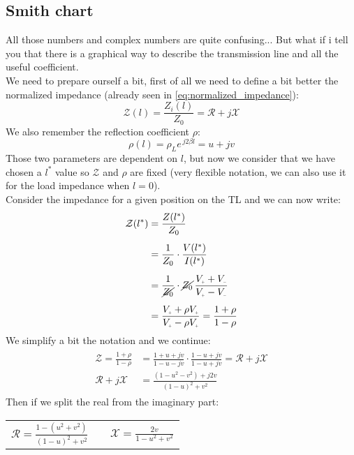 \subsection*{Smith chart}
All those numbers and complex numbers are quite confusing... But what if i tell you that there is a graphical way to describe the transmission line and all the useful coefficient.\\
We need to prepare ourself a bit, first of all we need to define a bit better the normalized impedance (already seen in \cref{eq:normalized_impedance}):
\begin{equation}
    \mathcal{Z}(l)=\frac{Z_i(l)}{Z_0}=\mathcal{R}+j\mathcal{X}
\end{equation}
We also remember the reflection coefficient $\rho$:
\begin{equation}
    \rho(l)=\rho_L e^{\,j2\beta l}=u+jv
\end{equation}
Those two parameters are dependent on $l$, but now we consider that we have chosen a $l^*$ value so $\mathcal{Z}$ and $\rho$ are fixed (very flexible notation, we can also use it for the load impedance when $l=0$).\\
Consider the impedance for a given position on the TL and we can now write:
\begin{align}
    \begin{split}
        \mathcal{Z}(l^*) &=\frac{Z(l^*)}{Z_0}\\[5pt]
        &=\frac{1}{Z_0}\cdot \frac{V(l^*)}{I(l^*)}\\[5pt]
        &=\frac{1}{\cancel{Z_0}}\cdot \cancel{Z_0} \,\frac{V\bottomPlus +V\bottomMinus }{V\bottomPlus -V\bottomMinus }\\[5pt]
        &= \frac{V\bottomPlus +\rho V\bottomPlus }{V\bottomPlus -\rho V\bottomPlus } = \frac{1 +\rho }{1 -\rho }
    \end{split}
\end{align}
We simplify a bit the notation and we continue:
\begin{align}
    \begin{split}
        \mathcal{Z} =\frac{1+\rho}{1-\rho}& =\frac{1+u+jv}{1-u-jv}\cdot \frac{1-u+jv}{ 1-u+jv}=\mathcal{R}+j\mathcal{X}\\[5pt]
        \mathcal{R}+j\mathcal{X}&=\frac{(1-u^2-v^2)+j2v}{(1-u)^2+v^2}
    \end{split}
\end{align}
Then if we split the real from the imaginary part:
\begin{center}
    \begin{tabular}{ c c c }
        $\mathcal{R}=\frac{1-(u^2+v^2)}{(1-u)^2+v^2}$&
        &
        $\mathcal{X}=\frac{2v}{1-u^2+v^2}$
    \end{tabular}
\end{center}

